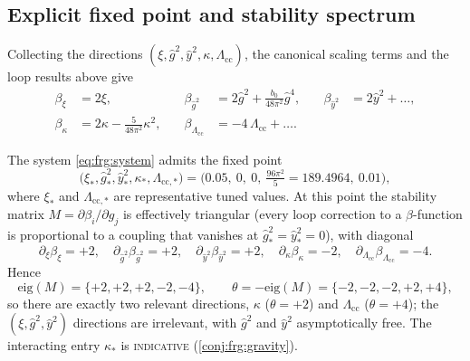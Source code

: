\subsection{Explicit fixed point and stability spectrum}
\label{sec:frg:fixedpoint}

Collecting the directions $(\xi,\hat g^{2},\hat y^{2},\kappa,\Lambda_{\mathrm{cc}})$,
the canonical scaling terms and the loop results above give
\begin{equation}\label{eq:frg:system}
\begin{aligned}
  \beta_{\xi}&=2\xi,
  &\quad
  \beta_{\hat g^{2}}&=2\hat g^{2}+\frac{b_{0}}{48\pi^{2}}\hat g^{4},
  &\quad
  \beta_{\hat y^{2}}&=2\hat y^{2}+\dots,
  \\[4pt]
  \beta_{\kappa}&=2\kappa-\frac{5}{48\pi^{2}}\kappa^{2},
  &\quad
  \beta_{\Lambda_{\mathrm{cc}}}&=-4\,\Lambda_{\mathrm{cc}}+\dots .
\end{aligned}
\end{equation}

\begin{theorem}
\label{thm:frg:fixedpoint}
The system \eqref{eq:frg:system} admits the fixed point
\begin{equation}\label{eq:frg:fpvalues}
  \bigl(\xi_{\ast},\hat g^{2}_{\ast},\hat y^{2}_{\ast},
        \kappa_{\ast},\Lambda_{\mathrm{cc},\ast}\bigr)
  =\bigl(0.05,\ 0,\ 0,\ \tfrac{96\pi^{2}}{5}=189.4964,\ 0.01\bigr),
\end{equation}
where $\xi_{\ast}$ and $\Lambda_{\mathrm{cc},\ast}$ are representative
tuned values. At this point the stability matrix
$M=\partial\beta_{i}/\partial g_{j}$ is effectively triangular (every loop
correction to a $\beta$-function is proportional to a coupling that
vanishes at $\hat g^{2}_{\ast}=\hat y^{2}_{\ast}=0$), with diagonal
\begin{equation}\label{eq:frg:diag}
  \partial_{\xi}\beta_{\xi}=+2,\quad
  \partial_{\hat g^{2}}\beta_{\hat g^{2}}=+2,\quad
  \partial_{\hat y^{2}}\beta_{\hat y^{2}}=+2,\quad
  \partial_{\kappa}\beta_{\kappa}=-2,\quad
  \partial_{\Lambda_{\mathrm{cc}}}\beta_{\Lambda_{\mathrm{cc}}}=-4 .
\end{equation}
Hence
\begin{equation}\label{eq:frg:eig}
  \mathrm{eig}(M)=\{+2,+2,+2,-2,-4\},
  \qquad
  \theta=-\mathrm{eig}(M)=\{-2,-2,-2,+2,+4\},
\end{equation}
so there are exactly two relevant directions, $\kappa$ ($\theta=+2$) and
$\Lambda_{\mathrm{cc}}$ ($\theta=+4$); the $(\xi,\hat g^{2},\hat y^{2})$
directions are irrelevant, with $\hat g^{2}$ and $\hat y^{2}$ asymptotically
free. The interacting entry $\kappa_{\ast}$ is \textsc{indicative}
(\autoref{conj:frg:gravity}).
\end{theorem}

